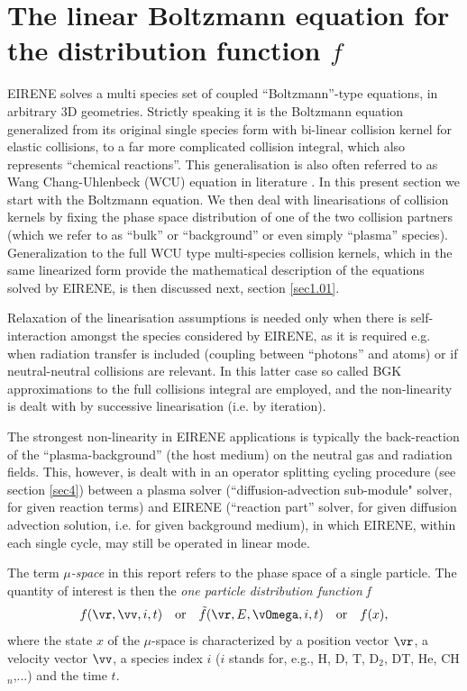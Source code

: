 \section{The linear Boltzmann equation for the distribution function
$f$} \label{sec1.0}
EIRENE solves a multi species set of coupled ``Boltzmann''-type equations, in arbitrary 3D geometries.
Strictly speaking it is the Boltzmann equation generalized from its original single species form with
bi-linear collision kernel for elastic collisions,
to a far more complicated collision integral, which also represents  ``chemical reactions''.
This generalisation is also often referred to as Wang Chang-Uhlenbeck (WCU) equation in literature \cite{kn:WCU}.
In this present section we start with the Boltzmann equation. We then deal with linearisations of collision
kernels by fixing the phase space distribution of one of the two collision partners (which we refer to as ``bulk''
or ``background'' or even simply ``plasma'' species). Generalization to the full WCU type multi-species collision kernels, which in the same
linearized form provide the mathematical description of the equations solved by EIRENE, is then discussed next, section \ref{sec1.01}.

Relaxation of the linearisation assumptions is needed only when there is self-interaction amongst the species considered by EIRENE,
as it is required e.g. when radiation transfer is included (coupling between ``photons'' and atoms) or if
neutral-neutral collisions are relevant. In this latter case so called BGK approximations to the full collisions integral
are employed, and the non-linearity is dealt with by successive linearisation (i.e. by iteration).

The strongest non-linearity in EIRENE applications is typically the back-reaction of the ``plasma-background'' (the host medium) on the
neutral gas and radiation fields. This, however, is dealt with in an operator splitting cycling procedure (see section \ref{sec4}) between a plasma solver (``diffusion-advection sub-module" solver, for given reaction terms) and EIRENE (``reaction part'' solver, for given diffusion advection solution, i.e. for given background medium), in which
EIRENE, within each single cycle, may still be operated in linear mode.






The term {\sl  $\mu$-space } in this report refers to the phase
space of a single particle. The quantity of interest is then the
{\sl  one particle distribution function }  {\it f}
\[
f(\vr, \vv, i, t)  \quad \mbox{or} \quad \tilde f(\vr, E, \vOmega, i, t)
\quad \mbox{or} \quad f(x) ,
\]
where the state $x$ of the $\mu$-space is characterized by a
position vector $\vr$, a velocity vector
$\vv$, a species index $i$ ($i$ stands for, e.g.,
H, D, T, D$_2$, DT, He, CH$_n$,...) and the time $t$.

